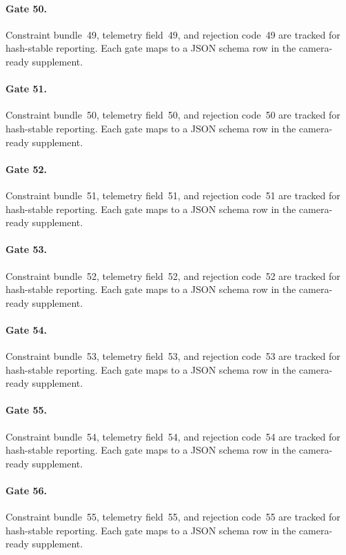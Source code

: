 \documentclass[sigconf,nonacm]{acmart}
\begin{document}
\paragraph{Gate 50.}
Constraint bundle~49, telemetry field~49, and rejection code~49 are tracked for hash-stable reporting. Each gate maps to a JSON schema row in the camera-ready supplement. %

\paragraph{Gate 51.}
Constraint bundle~50, telemetry field~50, and rejection code~50 are tracked for hash-stable reporting. Each gate maps to a JSON schema row in the camera-ready supplement. %

\paragraph{Gate 52.}
Constraint bundle~51, telemetry field~51, and rejection code~51 are tracked for hash-stable reporting. Each gate maps to a JSON schema row in the camera-ready supplement. %

\paragraph{Gate 53.}
Constraint bundle~52, telemetry field~52, and rejection code~52 are tracked for hash-stable reporting. Each gate maps to a JSON schema row in the camera-ready supplement. %

\paragraph{Gate 54.}
Constraint bundle~53, telemetry field~53, and rejection code~53 are tracked for hash-stable reporting. Each gate maps to a JSON schema row in the camera-ready supplement. %

\paragraph{Gate 55.}
Constraint bundle~54, telemetry field~54, and rejection code~54 are tracked for hash-stable reporting. Each gate maps to a JSON schema row in the camera-ready supplement. %

\paragraph{Gate 56.}
Constraint bundle~55, telemetry field~55, and rejection code~55 are tracked for hash-stable reporting. Each gate maps to a JSON schema row in the camera-ready supplement. %
\end{document}
